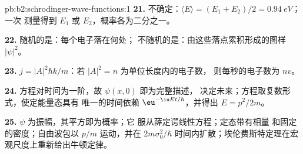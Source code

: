 \begin{solution}{pb:b2:schrodinger-wave-functions:1}
\textbf{21.} 不确定：$\langle E\rangle = (E_1 + E_2)/2 = \qty{0.94}{eV}$；一次
测量得到 $E_1$ 或 $E_2$，概率各为二分之一。

\textbf{22.} 随机的是：每个电子落在何处；
不随机的是：由这些落点累积形成的图样 $|\psi|^2$。

\textbf{23.} $j = |A|^2\hbar k/m$：若 $|A|^2 = n$ 为单位长度内的电子数，
则每秒的电子数为 $nv$。

\textbf{24.} 方程对时间为一阶，故 $\psi(x,0)$ 即为完整描述，
决定未来；方程取复数形式，使定能量态具有
唯一的时间依赖 $\eu^{-\iu Et/\hbar}$，并得出 $E = p^2/2m$。

\textbf{25.} $\psi$ 为振幅，其平方即为概率；它
服从薛定谔线性方程；定态带有相量
和固定的密度；自由波包以 $p/m$ 运动，并在
$2m\sigma_0^2/\hbar$ 时间内扩散；埃伦费斯特定理在宏观尺度上重新给出牛顿定律。
\end{solution}
